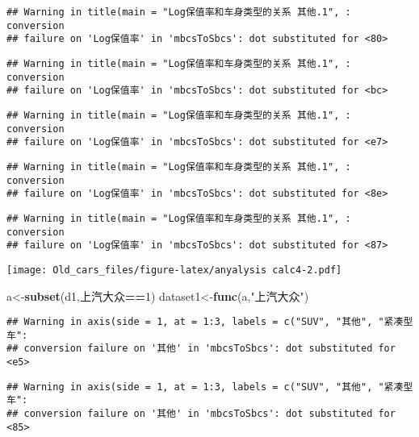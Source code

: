 \documentclass[]{article}
\newenvironment{Shaded}{\begin{snugshade}}{\end{snugshade}}
\newcommand{\KeywordTok}[1]{\textcolor[rgb]{0.13,0.29,0.53}{\textbf{#1}}}
\newcommand{\DecValTok}[1]{\textcolor[rgb]{0.00,0.00,0.81}{#1}}
\newcommand{\StringTok}[1]{\textcolor[rgb]{0.31,0.60,0.02}{#1}}
\newcommand{\OperatorTok}[1]{\textcolor[rgb]{0.81,0.36,0.00}{\textbf{#1}}}
\newcommand{\NormalTok}[1]{#1}
\begin{document}
\begin{verbatim}
## Warning in title(main = "Log保值率和车身类型的关系 其他.1", : conversion
## failure on 'Log保值率' in 'mbcsToSbcs': dot substituted for <80>
\end{verbatim}

\begin{verbatim}
## Warning in title(main = "Log保值率和车身类型的关系 其他.1", : conversion
## failure on 'Log保值率' in 'mbcsToSbcs': dot substituted for <bc>
\end{verbatim}

\begin{verbatim}
## Warning in title(main = "Log保值率和车身类型的关系 其他.1", : conversion
## failure on 'Log保值率' in 'mbcsToSbcs': dot substituted for <e7>
\end{verbatim}

\begin{verbatim}
## Warning in title(main = "Log保值率和车身类型的关系 其他.1", : conversion
## failure on 'Log保值率' in 'mbcsToSbcs': dot substituted for <8e>
\end{verbatim}

\begin{verbatim}
## Warning in title(main = "Log保值率和车身类型的关系 其他.1", : conversion
## failure on 'Log保值率' in 'mbcsToSbcs': dot substituted for <87>
\end{verbatim}

\texttt{[image: Old\_cars\_files/figure-latex/anyalysis calc4-2.pdf]}

\begin{Shaded}
\begin{Highlighting}[]
\NormalTok{a<-}\KeywordTok{subset}\NormalTok{(d1,上汽大众}\OperatorTok{==}\DecValTok{1}\NormalTok{)}
\NormalTok{dataset1<-}\KeywordTok{func}\NormalTok{(a,}\StringTok{"上汽大众"}\NormalTok{)}
\end{Highlighting}
\end{Shaded}

\begin{verbatim}
## Warning in axis(side = 1, at = 1:3, labels = c("SUV", "其他", "紧凑型车":
## conversion failure on '其他' in 'mbcsToSbcs': dot substituted for <e5>
\end{verbatim}

\begin{verbatim}
## Warning in axis(side = 1, at = 1:3, labels = c("SUV", "其他", "紧凑型车":
## conversion failure on '其他' in 'mbcsToSbcs': dot substituted for <85>
\end{verbatim}
\end{document}
